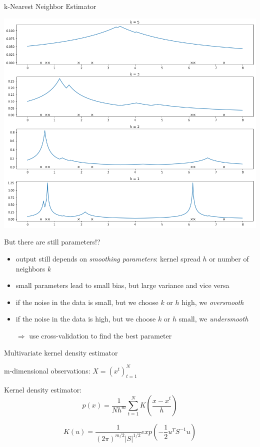 \documentclass{beamer}
\begin{document}
\begin{frame}[fragile]{k-Nearest Neighbor Estimator}
  \begin{center}
    \includegraphics[height=0.9\textheight]{images/knn_estimator.png}
  \end{center}
\end{frame}


\begin{frame}[fragile]{But there are still parameters!?}
  \begin{itemize}
    \item output still depends on \textit{smoothing parameters}: kernel spread $h$ or number of neighbors $k$
    \item small parameters lead to small bias, but large variance and vice versa
    \item if the noise in the data is small, but we choose $k$ or $h$ high, we \textit{oversmooth}
    \item if the noise in the data is high, but we choose $k$ or $h$ small, we \textit{undersmooth}
    \item[$\Rightarrow$] use cross-validation to find the best parameter
  \end{itemize}
\end{frame}


\begin{frame}[fragile]{Multivariate kernel density estimator}


m-dimensional observations:\: \(X=\left(x^{t}\right)^{N}_{t=1}\)

Kernel density estimator:
	\begin{equation}
		\hat p(x)=\frac{1}{Nh^m}\sum_{t=1}^{N}K\left( \frac{x-x^t}{h}\right)
	\end{equation}
	
	\begin{equation}
		K(u)=\frac{1}{\left(2\pi\right)^{m/2}|S|^{1/2}}exp\left(-\frac{1}{2}u^{T}S^{-1}u\right)
	\end{equation} 	
\end{frame}
\end{document}
